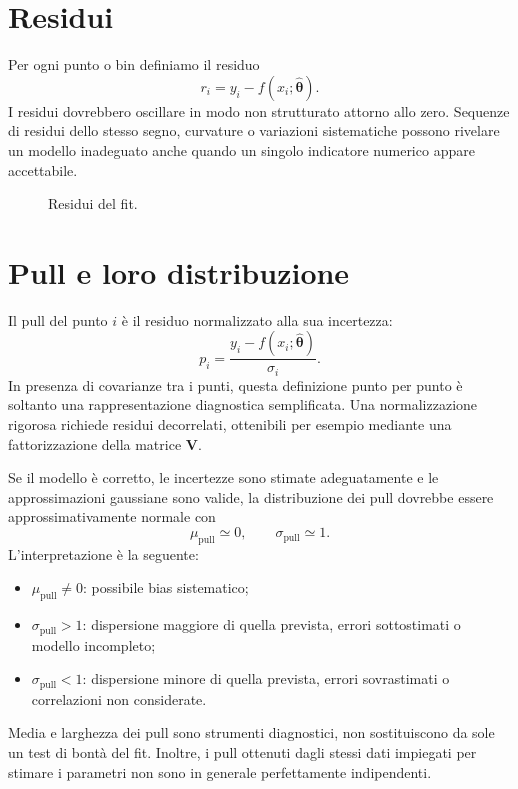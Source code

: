 \documentclass[11pt,a4paper]{book}
\begin{document}
\section{Residui}
Per ogni punto o bin definiamo il residuo
\begin{equation}
 r_i=y_i-f(x_i;\widehat{\bm\theta}).
\end{equation}
I residui dovrebbero oscillare in modo non strutturato attorno allo zero. Sequenze di residui dello stesso segno, curvature o variazioni sistematiche possono rivelare un modello inadeguato anche quando un singolo indicatore numerico appare accettabile.

\begin{figure}[htbp]
  \centering
  \caption{Residui del fit.}
  \label{fig:residui}
\end{figure}

\section{Pull e loro distribuzione}
Il pull del punto $i$ è il residuo normalizzato alla sua incertezza:
\begin{equation}
 p_i=\frac{y_i-f(x_i;\widehat{\bm\theta})}{\sigma_i}.
\end{equation}
In presenza di covarianze tra i punti, questa definizione punto per punto è soltanto una rappresentazione diagnostica semplificata. Una normalizzazione rigorosa richiede residui decorrelati, ottenibili per esempio mediante una fattorizzazione della matrice $\mathbf V$.

Se il modello è corretto, le incertezze sono stimate adeguatamente e le approssimazioni gaussiane sono valide, la distribuzione dei pull dovrebbe essere approssimativamente normale con
\begin{equation}
 \mu_{\mathrm{pull}}\simeq0,
 \qquad
 \sigma_{\mathrm{pull}}\simeq1.
\end{equation}
L'interpretazione è la seguente:
\begin{itemize}
 \item $\mu_{\mathrm{pull}}\neq0$: possibile bias sistematico;
 \item $\sigma_{\mathrm{pull}}>1$: dispersione maggiore di quella prevista, errori sottostimati o modello incompleto;
 \item $\sigma_{\mathrm{pull}}<1$: dispersione minore di quella prevista, errori sovrastimati o correlazioni non considerate.
\end{itemize}
Media e larghezza dei pull sono strumenti diagnostici, non sostituiscono da sole un test di bontà del fit. Inoltre, i pull ottenuti dagli stessi dati impiegati per stimare i parametri non sono in generale perfettamente indipendenti.
\end{document}
